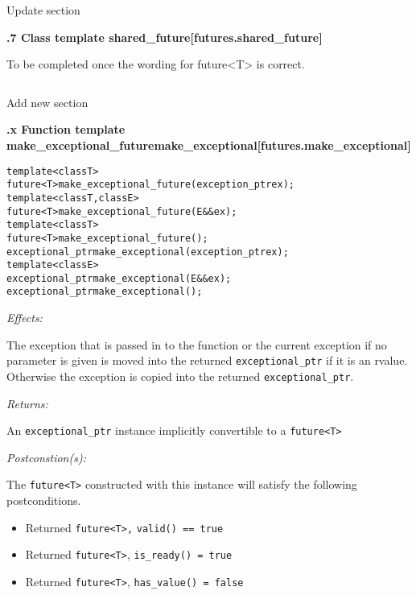 \documentclass[a4paper,10pt]{article}
\newcommand{\wordingUpdateSubSubSec}[2]{\vspace{15pt}
\noindent
{\textbf{\quad #1\hfill\textbf{[#2]}}}
\label{#2}
\vspace{7pt}
}
\newcommand{\wordingNewSubSubSec}[2]{\vspace{15pt}
\noindent
{\textbf{\quad #1\hfill\textbf{[#2]}}}
\label{#2}
\vspace{7pt}
}
\newcommand{\cpp}[1]{\lstinline{#1}}
\newcommand{\wordingItem}[1]{\noindent\textit{#1:}}
\newenvironment{wordingPara}{\begin{adjustwidth}{12pt}{}}{\end{adjustwidth}}
\newenvironment{Effects}{\wordingItem{Effects}\vspace{7pt}\noindent\begin{adjustwidth}{12pt}{}}{\vspace{7pt}\end{adjustwidth}}
\newenvironment{Returns}{\wordingItem{Returns}\vspace{7pt}\noindent\begin{adjustwidth}{12pt}{}}{\vspace{7pt}\end{adjustwidth}}
\newenvironment{Postconditions}{\wordingItem{Postconstion(s)}\vspace{7pt}\noindent\begin{adjustwidth}{12pt}{}}{\vspace{7pt}\end{adjustwidth}}
\newcommand{\suppress}[1]{\colorbox{suppress_color}{#1}}
\newcommand{\update}[1]{\colorbox{update_color}{#1}}
\begin{document}
\noindent
Update section

\wordingUpdateSubSubSec{30.6.7 Class template shared_future}{futures.shared_future}

\noindent
To be completed once the wording for future<T> is correct.

\begin{lstlisting}[xleftmargin=0pt]
\end{lstlisting}

\noindent
Add new section

\wordingNewSubSubSec{30.6.x Function template \suppress{make_exceptional_future}\update{make_exceptional}}{futures.make_exceptional}


\begin{alltt}
\suppress{template <class T>}
\suppress{  future<T> make_exceptional_future(exception_ptr ex);}
\suppress{template <class T, class E>}
\suppress{  future<T> make_exceptional_future(E\update{&&} ex);}
\suppress{template <class T>}
\suppress{  future<T> make_exceptional_future();}
\update{exceptional_ptr make_exceptional(exception_ptr ex);}
\update{template <class E>}
\update{  exceptional_ptr make_exceptional(E&& ex);}
\update{exceptional_ptr make_exceptional();}

\end{alltt}
\begin{wordingPara}

\begin{Effects}
The exception that is passed in to the function or the current exception if no parameter is given is moved into the returned \cpp{exceptional_ptr} if it 
is an rvalue. Otherwise the exception is copied into the returned \cpp{exceptional_ptr}. 
\end{Effects}
 
\begin{Returns}
An \cpp{exceptional_ptr} instance implicitly convertible to a \cpp{future<T>} 
\end{Returns}

\begin{Postconditions}
The  \cpp{future<T>} constructed with this instance will satisfy the following postconditions.
\begin{itemize}
\item Returned \cpp{future<T>,} \cpp{valid() == true} 
\item Returned \cpp{future<T>}, \cpp{is_ready() = true}
\item Returned \cpp{future<T>}, \cpp{has_value() = false}
\end{itemize}
\end{Postconditions}

\end{wordingPara}
\end{document}
